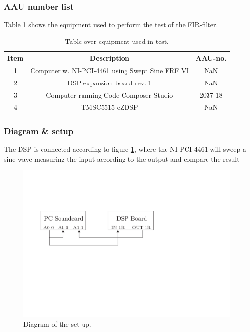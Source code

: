 

\subsubsection{AAU number list}
Table \ref{tab:UsedEquipmentListningFIRTest} shows the equipment used to perform the test of the FIR-filter.
\begin{table}[H]
	\centering
	\begin{tabular}{ c c c } \toprule
	{Item}	& {Description} 								& {AAU-no}. 	\\ \bottomrule 
	1	&	Computer w. NI-PCI-4461 using Swept Sine FRF VI	& NaN			\\
	2	&	DSP expansion board rev. 1 						& NaN			\\
	3	&	Computer running Code Composer Studio			& 2037-18		\\
	4	&	TMSC5515 eZDSP 									& NaN			\\
	\bottomrule
	\end{tabular}
	\caption{Table over equipment used in test.}
	\label{tab:UsedEquipmentListningFIRTest}
\end{table}

\subsubsection{Diagram \& setup}

The DSP is connected according to figure \ref{Fig:FIRSetupDiagram}, where the NI-PCI-4461 will sweep a sine wave measuring the input according to the output and compare the result

\begin{figure}[H]
	\centering
	\includegraphics{../Journal/Experiments/Figures/FIRFilterTestSetup}
	\caption{Diagram of the set-up.}
	\label{Fig:FIRSetupDiagram}
\end{figure}

